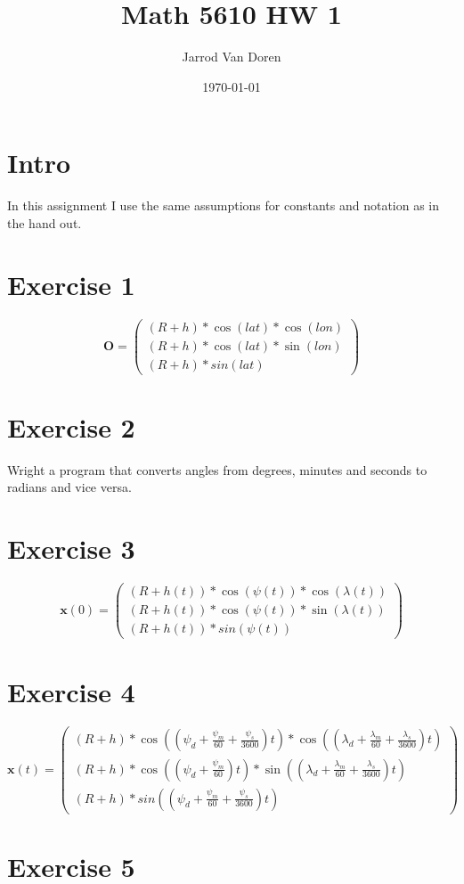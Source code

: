 \documentclass[letterpaper,11pt]{article}
\author{Jarrod Van Doren}
\title{Math 5610 HW 1}
\date{\today}
\begin{document}
	\maketitle
	\section*{Intro}
	In this assignment I use the same assumptions for constants and notation as in the hand out.

	\section*{Exercise 1}
	\[ \mathbf{O} = 
	  \begin{pmatrix}
	    (R + h) * \cos(lat) * \cos(lon)\\
	    (R + h) * \cos(lat) * \sin(lon)\\
	    (R + h) * sin(lat)
	  \end{pmatrix} \]

	\section*{Exercise 2}
	  Wright a program that converts angles from degrees, minutes and seconds to radians
	  and vice versa.
	  
	\section*{Exercise 3}
	  \[\mathbf{x}(0) =    
	    \begin{pmatrix}
	    (R + h(t)) * \cos(\psi(t)) * \cos(\lambda(t))\\
	    (R + h(t)) * \cos(\psi(t)) * \sin(\lambda(t))\\
	    (R + h(t)) * sin(\psi(t))
	    \end{pmatrix}  \]
	
	\section*{Exercise 4}
	  \[\mathbf{x}(t) = 
	  \begin{pmatrix}
	  (R + h) * \cos((\psi_d + \frac{\psi_m}{60} + \frac{\psi_s}{3600})t) *
	  \cos((\lambda_d + \frac{\lambda_m}{60} + \frac{\lambda_s}{3600})t)\\
	  (R + h) * \cos((\psi_d + \frac{\psi_m}{60})t) * 
	  \sin((\lambda_d + \frac{\lambda_m}{60} + \frac{\lambda_s}{3600})t)\\
	  (R + h) * sin((\psi_d + \frac{\psi_m}{60} + \frac{\psi_s}{3600})t)
	  \end{pmatrix}  \]
	
	\section*{Exercise 5}
	  
	
\end{document}
